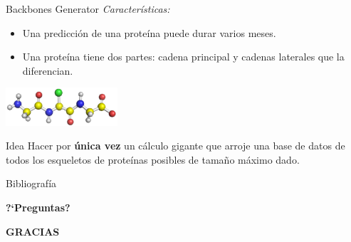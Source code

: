 \begin{frame}{Backbones Generator}
    \textit{Características:}
    \begin{itemize}
        \item Una predicción de una proteína puede durar varios meses.
        \item Una proteína tiene dos partes: cadena principal y cadenas laterales que la diferencian.
    \end{itemize}
    \begin{center}
        \includegraphics[height=40pt]{images/backbone.png}
    \end{center}
    \pause
    \begin{block}{Idea}
        Hacer por \textbf{única vez} un cálculo gigante que arroje una base de datos de todos los esqueletos de proteínas posibles de
        tamaño máximo dado.
    \end{block}
\end{frame}


\nocite{alsuwaiyel98}
\nocite{bellman10}
\nocite{clus09}
\nocite{uml}
\nocite{buyya99}
\nocite{cormen09}
\nocite{ewd1036}
\nocite{algorithms06}
\nocite{flynn}
\nocite{parallel}
\nocite{conmath94}
\nocite{levitin06}
\nocite{Liskov:1987:KAD:62139.62141}
\nocite{Lorin:1990:RHP:1011116.1011127}
\nocite{objmentor}
\nocite{martin-asd}
\nocite{oosc}
\nocite{pressman}
\nocite{svn}
\nocite{sigler03}
\nocite{skiena08}
\nocite{moshe10}
\nocite{cplusplus}
\nocite{algdatpro76}

\begin{frame}[allowframebreaks]{Bibliografía} 
    
    
\end{frame}

\begin{frame}
    \centerline{\Huge{\textbf{?`Preguntas?}}}
\end{frame}

\begin{frame}
    \centerline{\Huge{\textbf{GRACIAS}}}
\end{frame}
